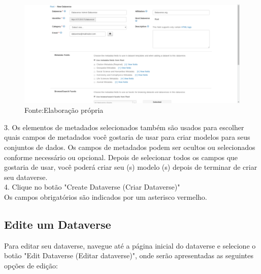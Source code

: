 \documentclass[12pt,hidelinks]{article}
\begin{document}
 \begin{figure}[H]
\centering
    \includegraphics[width=1.0\textwidth]{Prints/p4.png}
    \caption{Fonte:Elaboração própria}
    \label{print4}
\end{figure}
 
3. Os elementos de metadados selecionados também são usados para escolher quais campos de metadados você gostaria de usar para criar modelos para seus conjuntos de dados. Os campos de metadados podem ser ocultos ou selecionados conforme necessário ou opcional. Depois de selecionar todos os campos que gostaria de usar, você poderá criar seu (s) modelo (s) depois de terminar de criar seu dataverse.\\

4. Clique no botão "Create Dataverse (Criar Dataverse)"\\

Os campos obrigatórios são indicados por um asterisco vermelho.
    
    \subsection{Edite um Dataverse}
    
\qquad Para editar seu dataverse, navegue até a página inicial do dataverse e selecione o botão "Edit Dataverse (Editar dataverse)", onde serão apresentadas as seguintes opções de edição:
\end{document}
